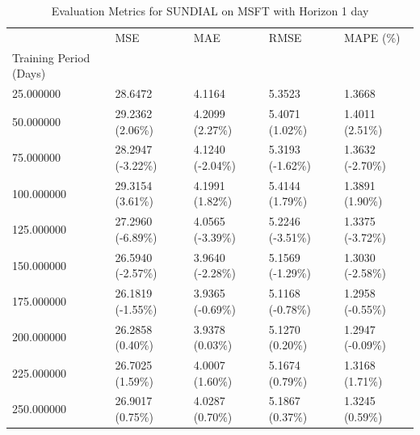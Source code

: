 \begin{table}
\caption{Evaluation Metrics for SUNDIAL on MSFT with Horizon 1 day}
\label{tab:sundial_MSFT_h1_metrics}
\begin{tabular}{lllll}
\toprule
 & MSE & MAE & RMSE & MAPE (\%) \\
Training Period (Days) &  &  &  &  \\
\midrule
25.000000 & 28.6472 & 4.1164 & 5.3523 & 1.3668 \\
50.000000 & 29.2362 (2.06\%) & 4.2099 (2.27\%) & 5.4071 (1.02\%) & 1.4011 (2.51\%) \\
75.000000 & 28.2947 (-3.22\%) & 4.1240 (-2.04\%) & 5.3193 (-1.62\%) & 1.3632 (-2.70\%) \\
100.000000 & 29.3154 (3.61\%) & 4.1991 (1.82\%) & 5.4144 (1.79\%) & 1.3891 (1.90\%) \\
125.000000 & 27.2960 (-6.89\%) & 4.0565 (-3.39\%) & 5.2246 (-3.51\%) & 1.3375 (-3.72\%) \\
150.000000 & 26.5940 (-2.57\%) & 3.9640 (-2.28\%) & 5.1569 (-1.29\%) & 1.3030 (-2.58\%) \\
175.000000 & 26.1819 (-1.55\%) & 3.9365 (-0.69\%) & 5.1168 (-0.78\%) & 1.2958 (-0.55\%) \\
200.000000 & 26.2858 (0.40\%) & 3.9378 (0.03\%) & 5.1270 (0.20\%) & 1.2947 (-0.09\%) \\
225.000000 & 26.7025 (1.59\%) & 4.0007 (1.60\%) & 5.1674 (0.79\%) & 1.3168 (1.71\%) \\
250.000000 & 26.9017 (0.75\%) & 4.0287 (0.70\%) & 5.1867 (0.37\%) & 1.3245 (0.59\%) \\
\bottomrule
\end{tabular}
\end{table}
